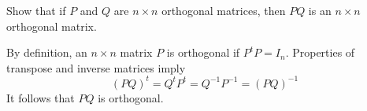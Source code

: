 \documentclass{ximera}
\author{Marty Golubitsky}
\begin{document}

\begin{exercise}\label{mc.exercise10}

Show that if $P$ and $Q$ are $n\times n$ orthogonal matrices, then $PQ$ is an $n\times n$ orthogonal matrix.
  
\begin{solution}


\soln By definition, an $n\times n$ matrix $P$ is orthogonal if $P^t P=I_n$. Properties of transpose and inverse matrices imply 
\[
(PQ)^t = Q^t P^t = Q^{-1} P^{-1} = (PQ)^{-1} 
\]
It follows that $PQ$ is orthogonal. 
\end{solution}
\end{exercise}
\end{document}
